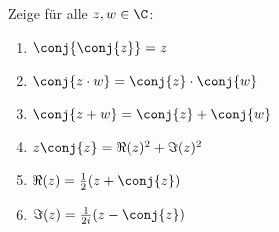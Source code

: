 \begin{prob}
  Zeige für alle  $z,w \in \C$:
  \begin{enumerate}[label=(\alph*)]
  \item $\conj{\conj{z}} = z$
  \item $\conj{z \cdot w} = \conj{z} \cdot \conj{w}$
  \item $\conj{z+w} = \conj{z} + \conj{w}$
  \item $z\conj{z} = \Re(z)^2 + \Im(z)^2$
  \item $\Re(z) = \frac{1}{2} (z + \conj{z})$
  \item $\Im(z) = \frac{1}{2i} (z - \conj{z})$
  \end{enumerate}
\end{prob}
